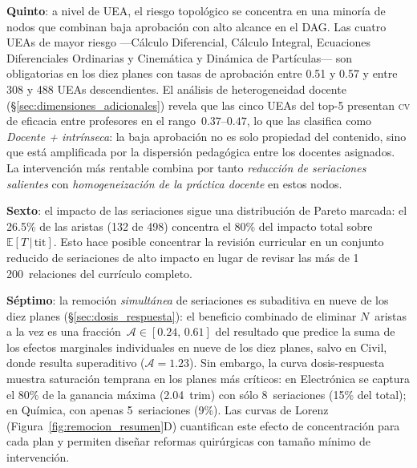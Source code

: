 \documentclass[11pt,letterpaper]{article}
\newcommand{\ETtit}{\mathbb{E}[T\,|\,\mathrm{tit}]}
\begin{document}
\textbf{Quinto}: a nivel de UEA, el riesgo topológico se concentra en una minoría
de nodos que combinan baja aprobación con alto alcance en el DAG.
Las cuatro UEAs de mayor riesgo ---Cálculo Diferencial, Cálculo Integral, Ecuaciones
Diferenciales Ordinarias y Cinemática y Dinámica de Partículas--- son obligatorias
en los diez planes con tasas de aprobación entre 0.51 y 0.57 y entre 308 y 488
UEAs descendientes.
El análisis de heterogeneidad docente (\S\ref{sec:dimensiones_adicionales}) revela
que las cinco UEAs del top-5 presentan \textsc{cv} de eficacia entre profesores en el
rango~$0.37$--$0.47$, lo que las clasifica como \emph{Docente + intrínseca}: la baja
aprobación no es solo propiedad del contenido, sino que está amplificada por la
dispersión pedagógica entre los docentes asignados.
La intervención más rentable combina por tanto \emph{reducción de seriaciones
salientes} con \emph{homogeneización de la práctica docente} en estos nodos.

\textbf{Sexto}: el impacto de las seriaciones sigue una distribución de Pareto
marcada: el 26.5\% de las aristas (132 de 498) concentra el 80\% del impacto
total sobre~$\ETtit$.
Esto hace posible concentrar la revisión curricular en un conjunto reducido de
seriaciones de alto impacto en lugar de revisar las más de 1\,200~relaciones del
currículo completo.

\textbf{Séptimo}: la remoción \emph{simultánea} de seriaciones es subaditiva en
nueve de los diez planes (§\ref{sec:dosis_respuesta}): el beneficio combinado
de eliminar $N$~aristas a la vez es una fracción~$\mathcal{A}\in[0.24,\,0.61]$
del resultado que predice la suma de los efectos marginales individuales en
nueve de los diez planes, salvo en Civil, donde resulta superaditivo
($\mathcal{A}=1.23$).
Sin embargo, la curva dosis-respuesta muestra saturación temprana en los planes más
críticos: en Electrónica se captura el 80\% de la ganancia máxima (2.04~trim) con
sólo 8~seriaciones (15\% del total); en Química, con apenas 5~seriaciones (9\%).
Las curvas de Lorenz (Figura~\ref{fig:remocion_resumen}D) cuantifican este efecto
de concentración para cada plan y permiten diseñar reformas quirúrgicas con tamaño
mínimo de intervención.
\end{document}
